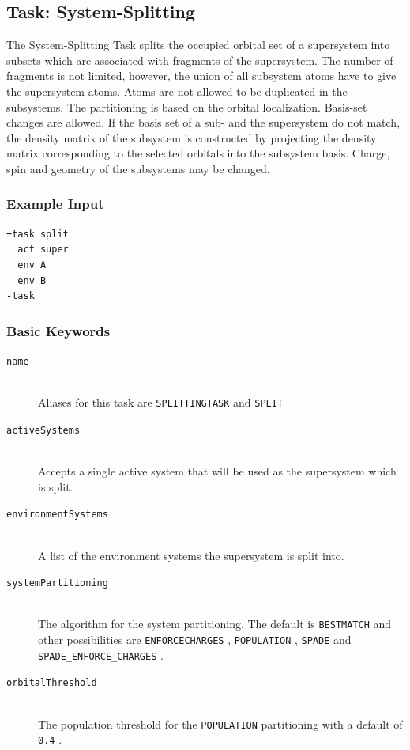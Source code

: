 \documentclass[bibliography=totocnumbered,a4paper,10pt,oneside]{scrbook}
\newcommand{\ttt}[1]{%
  \begingroup\setlength{\fboxsep}{1pt}%
  \colorbox{serenity-green!30}{\texttt{\hspace*{2pt}\vphantom{(g}#1\hspace*{2pt}}}%
  \endgroup
}
\begin{document}
\subsection{Task: System-Splitting}
The System-Splitting Task splits the occupied orbital set of a supersystem into subsets which are associated with fragments of the supersystem. The number of fragments is not limited, however, the union of all subsystem atoms have to give the supersystem atoms. Atoms are not allowed to be duplicated in the subsystems. The partitioning is based on the orbital localization. Basis-set changes are allowed. If the basis set of a sub- and the supersystem do not match, the density matrix of the subsystem is constructed by projecting the density matrix corresponding to the selected orbitals into the subsystem basis. Charge, spin and geometry of
the subsystems may be changed.
\subsubsection{Example Input}
\begin{lstlisting}
+task split
  act super
  env A
  env B
-task
\end{lstlisting}
\subsubsection{Basic Keywords}
\begin{description}
	\item[\texttt{name}]\hfill \\
	Aliases for this task are \ttt{SPLITTINGTASK} and \ttt{SPLIT}
	\item[\texttt{activeSystems}]\hfill \\
	Accepts a single active system that will be used as the supersystem which is split.
	\item[\texttt{environmentSystems}]\hfill \\
	A list of the environment systems the supersystem is split into.
	\item[\texttt{systemPartitioning}]\hfill \\
	The algorithm for the system partitioning. The default is \ttt{BESTMATCH} and other possibilities are \ttt{ENFORCECHARGES}, \ttt{POPULATION}, \ttt{SPADE} and  \ttt{SPADE\_ENFORCE\_CHARGES}.
	\item[\texttt{orbitalThreshold}]\hfill \\
	The population threshold for the \ttt{POPULATION} partitioning with a default of \ttt{0.4}.
\end{description}
\end{document}
